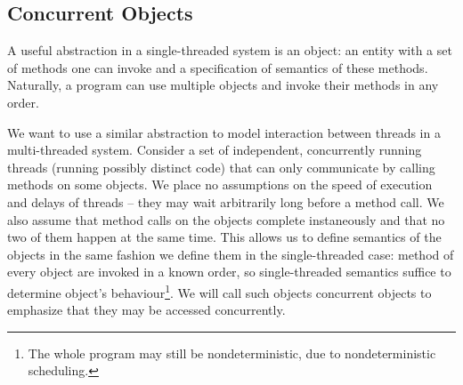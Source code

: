 \documentclass[a4paper,11pt]{article}
\begin{document}
\subsection{Concurrent Objects}
A useful abstraction in a single-threaded system is an object: an entity with a set of methods one can invoke
and a specification of semantics of these methods. Naturally, a program can use multiple objects and invoke
their methods in any order.

We want to use a similar abstraction to model interaction between threads in a multi-threaded system.
Consider a set of independent, concurrently running threads (running possibly
distinct code) that can only communicate by calling methods on some objects. We place no assumptions on
the speed of execution and delays of threads -- they may wait arbitrarily long before a method call.
We also assume that method calls on the objects complete instaneously and that no two of them happen at the same time.
This allows us to define semantics of the objects in the same fashion we define them in the single-threaded case:
method of every object are invoked in a known order, so single-threaded semantics suffice to determine object's behaviour\footnote{The whole program may still be nondeterministic, due to nondeterministic scheduling.}.
We will call such objects concurrent objects to emphasize that they may be accessed concurrently.



\end{document}

